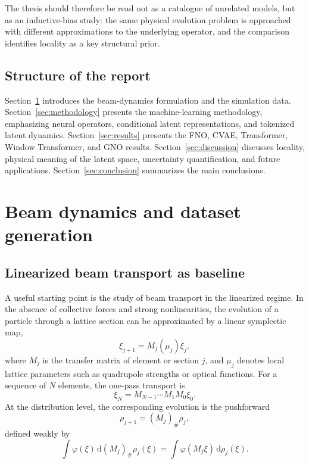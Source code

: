 \documentclass[11pt,a4paper]{article}
\providecommand{\dd}{\,\mathrm{d}}
\begin{document}
\begin{sloppypar}
The thesis should therefore be read not as a catalogue of unrelated models, but as an inductive-bias study: the same physical evolution problem is approached with different approximations to the underlying operator, and the comparison identifies locality as a key structural prior.

\subsection{Structure of the report}
Section~\ref{sec:beam_dynamics_data} introduces the beam-dynamics formulation and the simulation data. Section~\ref{sec:methodology} presents the machine-learning methodology, emphasizing neural operators, conditional latent representations, and tokenized latent dynamics. Section~\ref{sec:results} presents the FNO, CVAE, Transformer, Window Transformer, and GNO results. Section~\ref{sec:discussion} discusses locality, physical meaning of the latent space, uncertainty quantification, and future applications. Section~\ref{sec:conclusion} summarizes the main conclusions.

\section{Beam dynamics and dataset generation}
\label{sec:beam_dynamics_data}

\subsection{Linearized beam transport as baseline}
A useful starting point is the study of beam transport in the linearized regime. In the absence of collective forces and strong nonlinearities, the evolution of a particle through a lattice section can be approximated by a linear symplectic map,
\begin{equation}
    \xi_{j+1}=M_j(\mu_j)\xi_j,
    \label{eq:linear_particle_transport}
\end{equation}
where $M_j$ is the transfer matrix of element or section $j$, and $\mu_j$ denotes local lattice parameters such as quadrupole strengths or optical functions. For a sequence of $N$ elements, the one-pass transport is
\begin{equation}
    \xi_N=M_{N-1}\cdots M_1M_0\xi_0.
\end{equation}
At the distribution level, the corresponding evolution is the pushforward
\begin{equation}
    \rho_{j+1}=(M_j)_\#\rho_j,
    \label{eq:linear_pushforward}
\end{equation}
defined weakly by
\begin{equation}
    \int \varphi(\xi)\dd (M_j)_\#\rho_j(\xi)=\int \varphi(M_j\xi)\dd\rho_j(\xi).
\end{equation}


\end{sloppypar}
\end{document}
